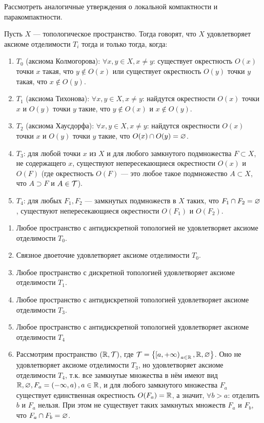 \begin{exercise}
    Рассмотреть аналогичные утверждения о локальной компактности и паракомпактности.
\end{exercise}

\begin{definition}
    Пусть $X$ --- топологическое пространство. Тогда говорят, что $X$ удовлетворяет аксиоме отделимости $T_{i}$ тогда и только тогда, когда:
    \begin{enumerate}
        \item $T_0$ (аксиома Колмогорова): $\forall x, y \in X, x \neq y$: существует окрестность $O(x)$ точки $x$ такая, что $y \notin O(x)$ или существует окрестность $O(y)$ точки $y$ такая, что $x \notin O(y)$.
        \item $T_1$ (аксиома Тихонова): $\forall x, y \in X, x \neq y$: найдутся окрестности $O(x)$ точки $x$ и $O(y)$ точки $y$ такие, что $y \notin O(x)$ и $x \notin O(y)$.
        \item $T_2$ (аксиома Хаусдорфа): $\forall x, y \in X, x \neq y$: найдутся окрестности $O(x)$ точки $x$ и $O(y)$ точки $y$ такие, что $O(x) \cap O(y) = \varnothing$.
        \item $T_3$: для любой точки $x$ из $X$ и для любого замкнутого подмножества $F \subset X$, не содержащего $x$, существуют непересекающиеся окрестности $O(x)$ и $O(F)$ (где окрестность $O(F)$ --- это любое такое подмножество $A \subset X$, что $A \supset F$ и $A \in \mathcal{T}$).
        \item $T_4$: для любых $F_1, F_2$ --- замкнутых подмножеств в $X$ таких, что $F_1 \cap F_2 = \varnothing$, существуют непересекающиеся окрестности $O(F_1)$ и $O(F_2)$.
    \end{enumerate}
\end{definition}

\begin{example}
    \begin{enumerate}
        \item Любое пространство с антидискретной топологией не удовлетворяет аксиоме отделимости $T_0$.
        \item Связное двоеточие удовлетворяет аксиоме отделимости $T_0$.
        \item Любое пространство с дискретной топологией удовлетворяет аксиоме отделимости $T_1$.
        \item Любое пространство с антидискретной топологией удовлетворяет аксиоме отделимости $T_3$.
        \item Любое пространство с антидискретной топологией удовлетворяет аксиоме отделимости $T_4$
        \item Рассмотрим пространство $\left(\mathbb{R}, \mathcal{T}\right)$, где $\mathcal{T} = \left\{ \!\left.\left[a, +\infty\right)\right._{a \in \mathbb{R}}, \mathbb{R}, \varnothing \right\}$. Оно не удовлетворяет аксиоме отделимости $T_3$, но удовлетворяет аксиоме отделимости $T_4$, т.к.
        все замкнутые множества в нём имеют вид $\mathbb{R}, \varnothing, F_{a} = \left(-\infty, a\right), a \in \mathbb{R}$, и для любого замкнутого множества $F_{a}$ существует единственная окрестность $O(F_{a}) = \mathbb{R}$, а значит, $\forall b > a$: отделить $b$ и $F_{a}$ нельзя.
        При этом не существует таких замкнутых множеств $F_{a}$ и $F_{b}$, что $F_{a} \cap F_{b} = \varnothing$.
    \end{enumerate}
\end{example}